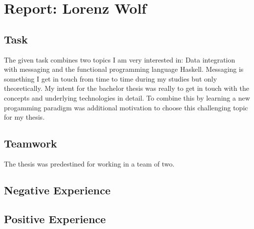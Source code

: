 \section*{Report: Lorenz Wolf}

\subsection*{Task}
The given task combines two topics I am very interested in: Data integration
with messaging and the functional programming language Haskell. Messaging is
something I get in touch from time to time during my studies but only
theoretically. My intent for the bachelor thesis was really to get in touch with
the concepts and underlying technologies in detail. To combine this by learning
a new progamming paradigm was additional motivation to choose this challenging
topic for my thesis.

\subsection*{Teamwork}
The thesis was predestined for working in a team of two. 

\subsection*{Negative Experience}
\subsection*{Positive Experience}


